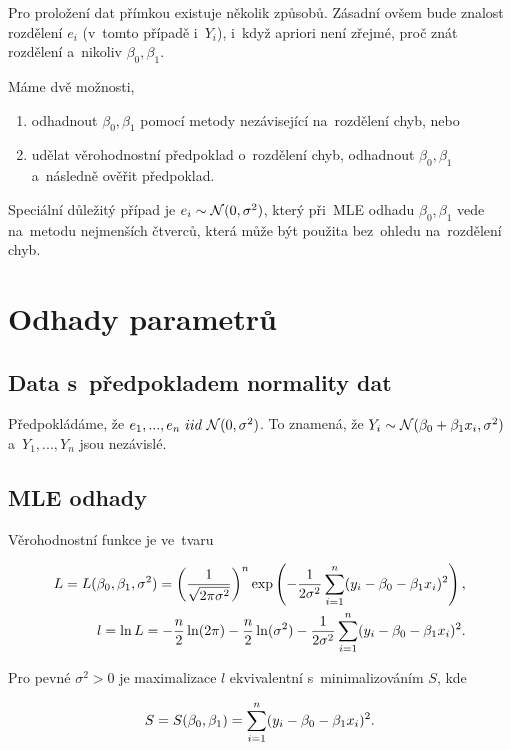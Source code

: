 Pro proložení dat přímkou existuje několik způsobů. Zásadní ovšem bude znalost rozdělení $e_i$ (v~tomto případě i~$Y_i$), i~když apriori není zřejmé, proč znát rozdělení a~nikoliv $\beta_0, \beta_1$.

Máme dvě možnosti,
\begin{enumerate}
  \item odhadnout $\beta_0, \beta_1$ pomocí metody nezávisející na~rozdělení chyb, nebo
  \item udělat věrohodnostní předpoklad o~rozdělení chyb, odhadnout $\beta_0, \beta_1$ a~následně ověřit předpoklad.
\end{enumerate}


\begin{remark}
 Speciální důležitý případ je $e_i \sim \mathcal{N}(0,\sigma^2)$, který při~MLE odhadu $\beta_0, \beta_1$ vede na~metodu nejmenších čtverců, která může být použita bez~ohledu na~rozdělení chyb.
\end{remark}

\section{Odhady parametrů}
\subsection{Data s~předpokladem normality dat}
Předpokládáme, že $e_1,..., e_n ~iid~\mathcal{N}(0,\sigma^2)$. To znamená, že $Y_i \sim \mathcal{N}(\beta_0 + \beta_1 x_i,\sigma^2)$ a~$Y_1,..., Y_n$ jsou nezávislé.

\subsection*{MLE odhady}

Věrohodnostní funkce je ve~tvaru

 $$
\begin{aligned}
	L = L (\beta_0, \beta_1, \sigma^2) = \left(\frac{1}{ \sqrt{ 2 \pi \sigma^2 }} \right)^n \exp \left(- \frac{1}{2 \sigma^2 } \sum\limits_{i=1}^{n}(y_i -  \beta_0  - \beta_1 x_i)^2 \right), \\
l = \ln L = -\frac{n}{2} \ln (2 \pi) -\frac{n}{2} \ln (\sigma^2) - \frac{1}{2 \sigma^2 } \sum\limits_{i=1}^{n}(y_i -  \beta_0  - \beta_1 x_i)^2.
\end{aligned}
 $$

Pro pevné $\sigma^2 > 0$ je maximalizace $l$ ekvivalentní s~minimalizováním $S$, kde

 $$
S = S(\beta_0, \beta_1) = \sum\limits_{i=1}^{n}(y_i -  \beta_0  - \beta_1 x_i)^2.
 $$

